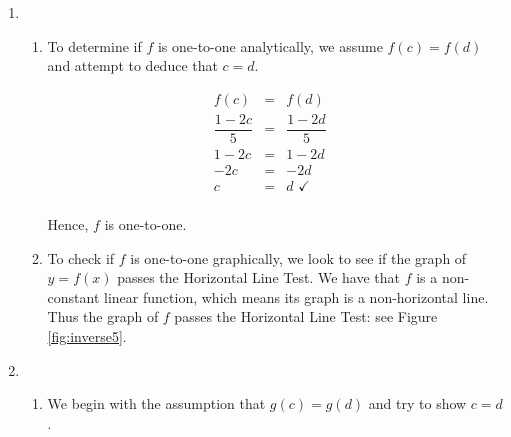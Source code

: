{
\begin{enumerate}

\item  \begin{enumerate} \item To determine if $f$ is one-to-one analytically, we assume $f(c) = f(d)$ and attempt to deduce that $c=d$. 

\[ \begin{array}{rclr}

f(c) & = & f(d) & \\ [3pt]
\dfrac{1-2c}{5} & = & \dfrac{1-2d}{5} & \\ [5pt]
1-2c & = & 1-2d & \\
-2c & = & -2d & \\
c & = & d \, \, \checkmark & \\

\end{array} \]

Hence, $f$ is one-to-one.

\item  To check if $f$ is one-to-one graphically, we look to see if the graph of $y=f(x)$ passes the Horizontal Line Test.  We have that $f$ is a non-constant linear function, which means its graph is a non-horizontal line.  Thus the  graph of $f$ passes the Horizontal Line Test: see Figure \ref{fig:inverse5}.


\end{enumerate}

\item \begin{enumerate} \item We begin with the assumption that $g(c) = g(d)$ and try to show $c=d$.


\end{enumerate}
\end{enumerate}}
